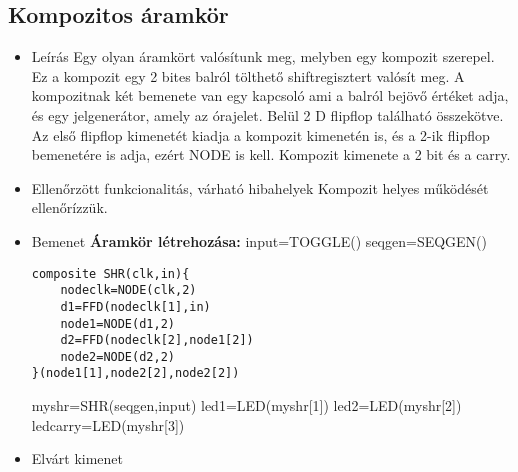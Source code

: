 \subsection{Kompozitos áramkör}
\begin{itemize}
\item Leírás\newline
Egy olyan áramkört valósítunk meg, melyben egy kompozit szerepel. Ez a kompozit egy 2 bites balról tölthető shiftregisztert valósít meg. A kompozitnak két bemenete van egy kapcsoló ami a balról bejövő értéket adja, és egy jelgenerátor, amely az órajelet. Belül 2 D flipflop található összekötve. Az első flipflop kimenetét kiadja a kompozit kimenetén is, és a 2-ik flipflop bemenetére is adja, ezért NODE is kell. Kompozit kimenete a 2 bit és a carry.
\item Ellenőrzött funkcionalitás, várható hibahelyek\newline
Kompozit helyes működését ellenőrízzük.
\item Bemenet\newline
\newline
{\bf Áramkör létrehozása:}\newline
input=TOGGLE() \newline
seqgen=SEQGEN()
\begin{verbatim}
composite SHR(clk,in){		
    nodeclk=NODE(clk,2)		
    d1=FFD(nodeclk[1],in)		
    node1=NODE(d1,2)			
    d2=FFD(nodeclk[2],node1[2])
    node2=NODE(d2,2)			
}(node1[1],node2[2],node2[2])	
\end{verbatim}
myshr=SHR(seqgen,input)\newline
led1=LED(myshr[1])\newline
led2=LED(myshr[2])\newline
ledcarry=LED(myshr[3])\newline


\item Elvárt kimenet\newline
{}
\end{itemize}


